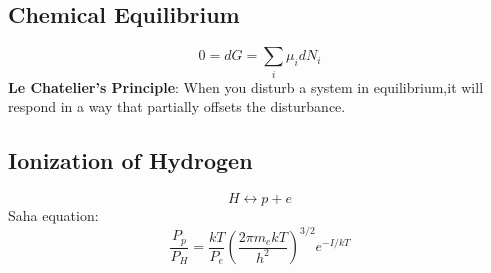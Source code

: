 \documentclass[a4paper,norsk, 10pt]{article}
\begin{document}
\subsection{Chemical Equilibrium}
\begin{equation}
0 = dG = \sum_i \mu_i dN_i
\end{equation}
\textbf{Le Chatelier's Principle}: When you disturb a system in equilibrium,it will respond in a way that partially offsets the disturbance.
\subsection{Ionization of Hydrogen}
\begin{equation}
H \leftrightarrow p + e
\end{equation}
Saha equation:
\begin{equation}
\frac{P_p}{P_H} = \frac{kT}{P_e}\left(\frac{2\pi m_e kT}{h^2}\right)^{3/2}e^{-I/kT}
\end{equation}
\end{document}
